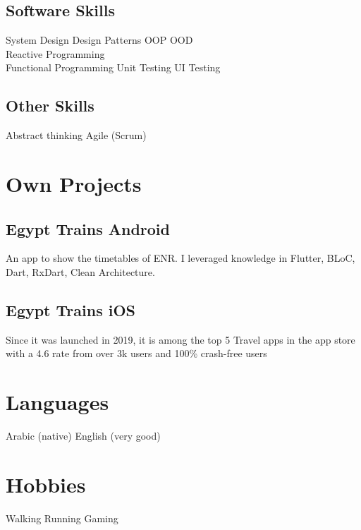 \documentclass[]{deedy-resume-openfont}
\begin{document}
\begin{minipage}[t]{1\textwidth}
\subsection{Software Skills}
System Design \textbullet{} Design Patterns \textbullet{} OOP \textbullet{} OOD \textbullet{}\\ Reactive Programming \textbullet{} \\ Functional Programming \textbullet{} Unit Testing \textbullet{} UI Testing
\sectionsep
\subsection{Other Skills}
Abstract thinking \textbullet{} Agile (Scrum)
\sectionsep



\section{Own Projects}
\subsection{Egypt Trains Android}
An app to show the timetables of ENR.
I leveraged knowledge in Flutter, BLoC, Dart, RxDart, Clean Architecture.
\sectionsep
\subsection{Egypt Trains iOS}
Since it was launched in 2019, it is among the top 5 Travel apps in the app store with a 4.6 rate from over 3k users and 100\% crash-free users
\sectionsep
\section{Languages}
Arabic (native) \textbullet{} English (very good)
\sectionsep

\section{Hobbies}
Walking \textbullet{} Running \textbullet{} Gaming
\end{minipage} 
\end{document}
